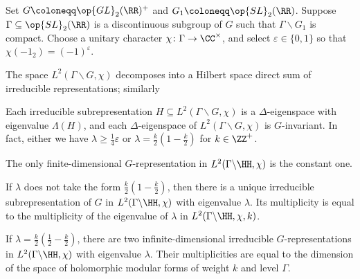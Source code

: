 \documentclass{article}
\begin{document}
\begin{theorem}
	Set $G\coloneqq\op{GL}_2(\RR)^+$ and $G_1\coloneqq\op{SL}_2(\RR)$. Suppose $\Gamma\subseteq\op{SL}_2(\RR)$ is a discontinuous subgroup of $G$ such that $\Gamma\backslash G_1$ is compact. Choose a unitary character $\chi\colon\Gamma\to\CC^\times$, and select $\varepsilon\in\{0,1\}$ so that $\chi(-1_2)=(-1)^\varepsilon$.
	\begin{listalph}
		\item The space $L^2(\Gamma\backslash G,\chi)$ decomposes into a Hilbert space direct sum of irreducible representations; similarly
		\item Each irreducible subrepresentation $H\subseteq L^2(\Gamma\backslash G,\chi)$ is a $\Delta$-eigenspace with eigenvalue $\Lambda(H)$, and each $\Delta$-eigenspace of $L^2(\Gamma\backslash G,\chi)$ is $G$-invariant. In fact, either we have $\lambda\ge\frac14\varepsilon$ or $\lambda=\frac k2\left(1-\frac k2\right)$ for $k\in\ZZ^+$.
		\item The only finite-dimensional $G$-representation in $L^2(\Gamma\backslash\HH,\chi)$ is the constant one.
		\item If $\lambda$ does not take the form $\frac k2\left(1-\frac k2\right)$, then there is a unique irreducible subrepresentation of $G$ in $L^2(\Gamma\backslash\HH,\chi)$ with eigenvalue $\lambda$. Its multiplicity is equal to the multiplicity of the eigenvalue of $\lambda$ in $L^2(\Gamma\backslash\HH,\chi,k)$.
		\item If $\lambda=\frac k2\left(\frac12-\frac k2\right)$, there are two infinite-dimensional irreducible $G$-representations in $L^2(\Gamma\backslash\HH,\chi)$ with eigenvalue $\lambda$. Their multiplicities are equal to the dimension of the space of holomorphic modular forms of weight $k$ and level $\Gamma$.
	\end{listalph}
\end{theorem}
\end{document}
